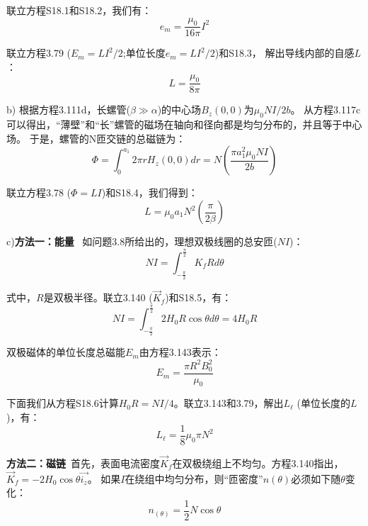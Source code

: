 联立方程S18.1和S18.2，我们有：
 \begin{equation}%
e_m=\frac{\mu_0}{16\pi}I^2
\end{equation}

联立方程3.79 ($E_m =LI^2/2$;单位长度$e_m =LI^2/2$)和S18.3，
解出导线内部的自感$L$：
 \begin{equation}%
L=\frac{\mu_0}{8\pi}
\end{equation}

b) 根据方程3.111d，长螺管($\beta\gg\alpha$)的中心场$B_z(0, 0)$为$\mu_0 NI/2b$。
从方程3.117c可以得出，“薄壁”和“长”螺管的磁场在轴向和径向都是均匀分布的，并且等于中心场。
于是，螺管的N匝交链的总磁链为：
 \begin{equation}%
\Phi=\int_{0}^{a_1}2\pi rH_z(0,0)dr=N\left(\frac{\pi a_{1}^{2}\mu_0NI}{2b}\right)
\end{equation}

联立方程3.78 ($\Phi=LI$)和S18.4，我们得到：
 \begin{equation}%
L=\mu_0a_1N^2(\frac{\pi}{2\beta})
\end{equation}

c)\textbf{方法一：能量} \ 如问题3.8所给出的，理想双极线圈的总安匝($NI$)：
\begin{equation}%
NI=\int_{-\frac{\pi}{2}}^{\frac{\pi}{2}}K_f Rd\theta
\end{equation}

式中，$R$是双极半径。联立3.140 ($\vec{K}_f$)和S18.5，有：
\begin{equation}%
NI=\int_{-\frac{\pi}{2}}^{\frac{\pi}{2}}2H_0R\cos\theta d\theta=4H_0R
\end{equation}

双极磁体的单位长度总磁能$E_m$由方程3.143表示：
 \begin{equation}%
E_m=\frac{\pi R^2B_{0}^{2}}{\mu_0}
\end{equation}

下面我们从方程S18.6计算$H_0R=NI/4$。联立3.143和3.79，解出$L_\ell$ (单位长度的$L$)，有：
 \begin{equation}%
L_\ell=\frac{1}{8}\mu_0\pi N^2
\end{equation}

\textbf{方法二：磁链}\ 首先，表面电流密度$\vec{K}_f$在双极绕组上不均匀。方程3.140指出，$\vec{K}_f=-2H_0\cos\theta\vec{i_z}$。
如果$I$在绕组中均匀分布，则“匝密度”$n(\theta)$必须如下随$\theta$变化：
\begin{equation}%
n_(\theta)=\frac{1}{2}N\cos\theta
\end{equation}

